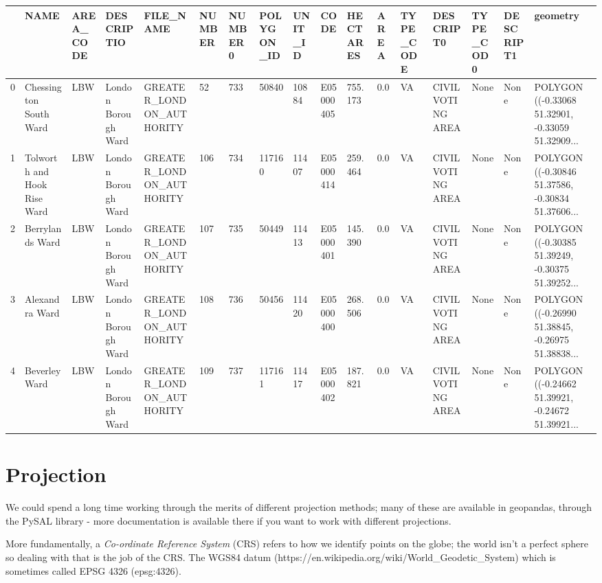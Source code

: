 \documentclass[
  letterpaper,
  DIV=11,
  numbers=noendperiod]{scrreprt}
\begin{document}
\begin{longtable}[]{@{}lllllllllllllllll@{}}
\toprule()
& NAME & AREA\_CODE & DESCRIPTIO & FILE\_NAME & NUMBER & NUMBER0 &
POLYGON\_ID & UNIT\_ID & CODE & HECTARES & AREA & TYPE\_CODE & DESCRIPT0
& TYPE\_COD0 & DESCRIPT1 & geometry \\
\midrule()
\endhead
0 & Chessington South Ward & LBW & London Borough Ward &
GREATER\_LONDON\_AUTHORITY & 52 & 733 & 50840 & 10884 & E05000405 &
755.173 & 0.0 & VA & CIVIL VOTING AREA & None & None & POLYGON
((-0.33068 51.32901, -0.33059 51.32909... \\
1 & Tolworth and Hook Rise Ward & LBW & London Borough Ward &
GREATER\_LONDON\_AUTHORITY & 106 & 734 & 117160 & 11407 & E05000414 &
259.464 & 0.0 & VA & CIVIL VOTING AREA & None & None & POLYGON
((-0.30846 51.37586, -0.30834 51.37606... \\
2 & Berrylands Ward & LBW & London Borough Ward &
GREATER\_LONDON\_AUTHORITY & 107 & 735 & 50449 & 11413 & E05000401 &
145.390 & 0.0 & VA & CIVIL VOTING AREA & None & None & POLYGON
((-0.30385 51.39249, -0.30375 51.39252... \\
3 & Alexandra Ward & LBW & London Borough Ward &
GREATER\_LONDON\_AUTHORITY & 108 & 736 & 50456 & 11420 & E05000400 &
268.506 & 0.0 & VA & CIVIL VOTING AREA & None & None & POLYGON
((-0.26990 51.38845, -0.26975 51.38838... \\
4 & Beverley Ward & LBW & London Borough Ward &
GREATER\_LONDON\_AUTHORITY & 109 & 737 & 117161 & 11417 & E05000402 &
187.821 & 0.0 & VA & CIVIL VOTING AREA & None & None & POLYGON
((-0.24662 51.39921, -0.24672 51.39921... \\
\bottomrule()
\end{longtable}

\hypertarget{projection}{%
\section{Projection}\label{projection}}

We could spend a long time working through the merits of different
projection methods; many of these are available in geopandas, through
the PySAL library - more documentation is available there if you want to
work with different projections.

More fundamentally, a \emph{Co-ordinate Reference System} (CRS) refers
to how we identify points on the globe; the world isn't a perfect sphere
so dealing with that is the job of the CRS. The WGS84 datum
(https://en.wikipedia.org/wiki/World\_Geodetic\_System) which is
sometimes called EPSG 4326 (epsg:4326).
\end{document}
